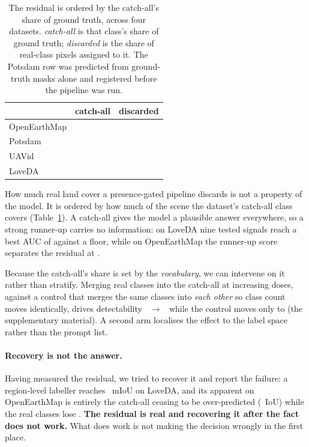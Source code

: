 \documentclass[10pt,twocolumn,letterpaper]{article}          %
\newcommand{\best}[1]{\textbf{#1}}
\newcommand{\suppref}[1]{the supplementary material}
\begin{document}
\begin{table}[t]\centering\small
\caption{The residual is ordered by the catch-all's share of ground truth, across
four datasets. \emph{catch-all} is that class's share of ground truth;
\emph{discarded} is the share of real-class pixels assigned to it. The Potsdam row
was predicted from ground-truth masks alone and registered before the pipeline was
run.}
\label{tab:cmech}
\begin{tabular}{lrr}
\toprule
 & catch-all & discarded \\
\midrule
OpenEarthMap & \bgShareOEM{} & \discardOEM{} \\
Potsdam      & \potsShare{} & \potsDiscard{} \\
UAVid        & \uavCatchShare{} & \uavDiscard{} \\
LoveDA       & \bgShareLove{} & \discardPct{} \\
\bottomrule
\end{tabular}
\end{table}

How much real land cover a presence-gated pipeline discards is not a property of the
model. It is ordered by how much of the scene the dataset's catch-all class covers
(Table~\ref{tab:cmech}). A catch-all gives the model a plausible answer everywhere, so
a strong runner-up carries no information: on LoveDA nine tested signals reach a best
AUC of \aucLove{} against a \aucFloor{} floor, while on OpenEarthMap the runner-up
score separates the residual at \aucOEM{}.

Because the catch-all's share is set by the \emph{vocabulary}, we can intervene on it
rather than stratify. Merging real classes into the catch-all at increasing doses,
against a control that merges the same classes into \emph{each other} so class count
moves identically, drives detectability \ivAtwo{}~$\to$~\ivBtwo{} while the control
moves only to \ivDtwo{} (\suppref{sec:dose}). A second arm localises the effect to the
label space rather than the prompt list.

\paragraph{Recovery is not the answer.} Having measured the residual, we tried to
recover it and report the failure: a region-level labeller reaches \recoverLove{}~mIoU
on LoveDA, and its apparent \recoverOEM{} on OpenEarthMap is entirely the catch-all
ceasing to be over-predicted (\oemBgGain{}~IoU) while the real classes lose
\oemRealLoss{}. \best{The residual is real and recovering it after the fact does not
work.} What does work is not making the decision wrongly in the first place.
\end{document}
